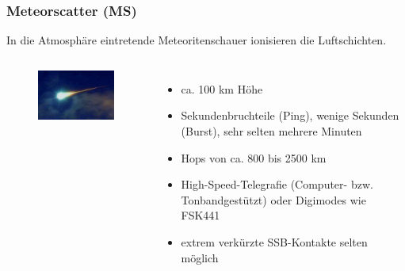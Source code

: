\begin{frame}
  \frametitle{Meteorscatter (MS)}

  In die Atmosphäre eintretende Meteoritenschauer ionisieren die
  Luftschichten.

  \begin{columns}
      \begin{center}
        \begin{figure}
          \includegraphics[width=\textwidth,height=.85\textheight,keepaspectratio]{bv11/Bolide.jpg}
        \end{figure}
      \end{center}
      \begin{itemize}
        \item ca. 100 km Höhe
        \item Sekundenbruchteile (Ping), wenige Sekunden (Burst), sehr selten
          mehrere Minuten
        \item Hops von ca. 800 bis 2500 km
        \item High-Speed-Telegrafie (Computer- bzw. Tonbandgestützt) oder Digimodes wie FSK441
        \item extrem verkürzte SSB-Kontakte selten möglich
      \end{itemize}
  \end{columns}


\end{frame}

